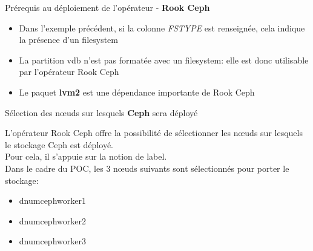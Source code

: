 
\begin{frame}[fragile]{Prérequis au déploiement de l'opérateur - \textbf{Rook Ceph}}

\begin{itemize}
   \item Dans l'exemple précédent, si la colonne \textit{FSTYPE} est renseignée, cela indique la présence d'un filesystem
   \item La partition vdb n'est pas formatée avec un filesystem: elle est donc utilisable par l'opérateur Rook Ceph
   \item Le paquet \textbf{lvm2} est une dépendance importante de Rook Ceph
\end{itemize}

\end{frame}


\begin{frame}[fragile]{Sélection des n\oe{}uds sur lesquels \textbf{Ceph} sera déployé}

   L'opérateur Rook Ceph offre la possibilité de sélectionner les n\oe{}uds sur lesquels le stockage Ceph est déployé.\\
   Pour cela, il s'appuie sur la notion de label.\\
   Dans le cadre du POC, les 3 n\oe{}uds suivants sont sélectionnés pour porter le stockage:
\begin{itemize}
   \item dnumcephworker1
   \item dnumcephworker2
   \item dnumcephworker3
\end{itemize}

\end{frame}


